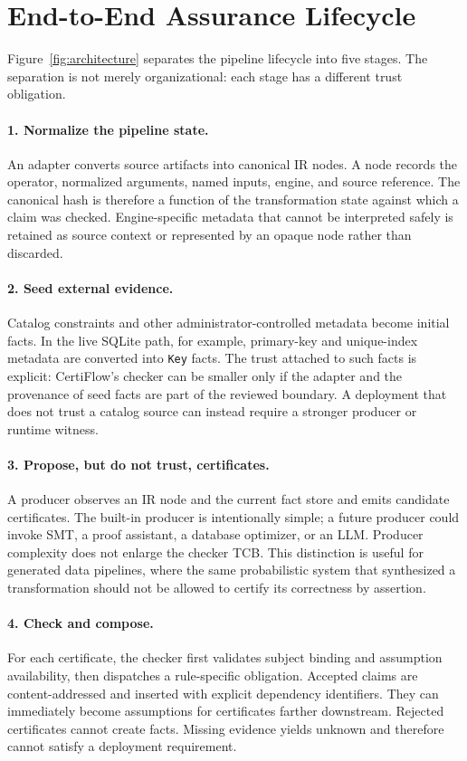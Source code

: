 \section{End-to-End Assurance Lifecycle}\label{sec:lifecycle}

Figure~\ref{fig:architecture} separates the pipeline lifecycle into five stages. The separation is not merely organizational: each stage has a different trust obligation.

\paragraph{1. Normalize the pipeline state.}
An adapter converts source artifacts into canonical IR nodes. A node records the operator, normalized arguments, named inputs, engine, and source reference. The canonical hash is therefore a function of the transformation state against which a claim was checked. Engine-specific metadata that cannot be interpreted safely is retained as source context or represented by an opaque node rather than discarded.

\paragraph{2. Seed external evidence.}
Catalog constraints and other administrator-controlled metadata become initial facts. In the live SQLite path, for example, primary-key and unique-index metadata are converted into \texttt{Key} facts. The trust attached to such facts is explicit: CertiFlow's checker can be smaller only if the adapter and the provenance of seed facts are part of the reviewed boundary. A deployment that does not trust a catalog source can instead require a stronger producer or runtime witness.

\paragraph{3. Propose, but do not trust, certificates.}
A producer observes an IR node and the current fact store and emits candidate certificates. The built-in producer is intentionally simple; a future producer could invoke SMT, a proof assistant, a database optimizer, or an LLM. Producer complexity does not enlarge the checker TCB. This distinction is useful for generated data pipelines, where the same probabilistic system that synthesized a transformation should not be allowed to certify its correctness by assertion.

\paragraph{4. Check and compose.}
For each certificate, the checker first validates subject binding and assumption availability, then dispatches a rule-specific obligation. Accepted claims are content-addressed and inserted with explicit dependency identifiers. They can immediately become assumptions for certificates farther downstream. Rejected certificates cannot create facts. Missing evidence yields \textsf{unknown} and therefore cannot satisfy a deployment requirement.

